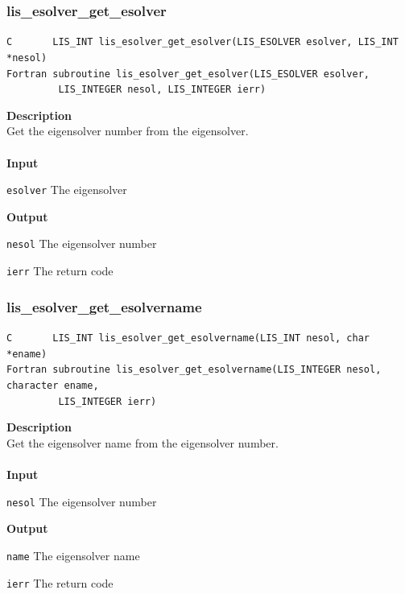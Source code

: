 \documentclass[a4paper]{article}
\newcommand{\namelistlabel}[1]{\mbox{#1}\hfill}
\newenvironment{namelist}[1]{%
\begin{list}{}
  {\let\makelabel\namelistlabel
  \settowidth{\labelwidth}{#1}
  \setlength{\leftmargin}{1.1\labelwidth}}
  }{%
\end{list}}
\begin{document}
\subsubsection{lis\_esolver\_get\_esolver}
\begin{screen}
\verb|C       LIS_INT lis_esolver_get_esolver(LIS_ESOLVER esolver, LIS_INT *nesol)|\\
\verb|Fortran subroutine lis_esolver_get_esolver(LIS_ESOLVER esolver,|\\
\verb|         LIS_INTEGER nesol, LIS_INTEGER ierr)|
\end{screen}
{\bf Description}\\
\indent
Get the eigensolver number from the eigensolver.
\\ \\
\noindent
{\bf Input}
\begin{namelist}{XXXXXXXXXXXXXXXXXXXX}
\item[\tt esolver] The eigensolver
\end{namelist}
{\bf Output}
\begin{namelist}{XXXXXXXXXXXXXXXXXXXX}
\item[\tt nesol] The eigensolver number
\item[\tt ierr] The return code
\end{namelist}

\subsubsection{lis\_esolver\_get\_esolvername}
\begin{screen}
\verb|C       LIS_INT lis_esolver_get_esolvername(LIS_INT nesol, char *ename)|\\
\verb|Fortran subroutine lis_esolver_get_esolvername(LIS_INTEGER nesol, character ename,|\\
\verb|         LIS_INTEGER ierr)|
\end{screen}
{\bf Description}\\
\indent
Get the eigensolver name from the eigensolver number.
\\ \\
\noindent
{\bf Input}
\begin{namelist}{XXXXXXXXXXXXXXXXXXXX}
\item[\tt nesol] The eigensolver number
\end{namelist}
{\bf Output}
\begin{namelist}{XXXXXXXXXXXXXXXXXXXX}
\item[\tt name] The eigensolver name
\item[\tt ierr] The return code
\end{namelist}
\end{document}
